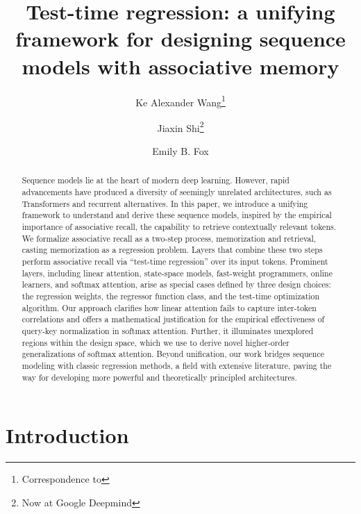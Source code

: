 \documentclass[notitlepage, 11pt]{article}
\title{Test-time regression: a unifying framework for designing sequence models with associative memory}
\author[$^1$]{Ke Alexander Wang\footnote{Correspondence to \email{alxwang@cs.stanford.edu}}}
\author[$^2$]{Jiaxin Shi\footnote{Now at Google Deepmind}}
\author[$^1$$^2$]{Emily B. Fox}
\affil[$^1$]{
  Department of Computer Science, Stanford University
}
\affil[$^2$]{
  Department of Statistics, Stanford University
}
\date{}
\begin{document}
\maketitle


\begin{abstract}






Sequence models lie at the heart of modern deep learning. However, rapid advancements have produced a diversity of seemingly unrelated architectures, such as Transformers and recurrent alternatives. In this paper, we introduce a unifying framework to understand and derive these sequence models, inspired by the empirical importance of associative recall, the capability to retrieve contextually relevant tokens. We formalize associative recall as a two-step process, memorization and retrieval, casting memorization as a regression problem. Layers that combine these two steps perform associative recall via ``test-time regression'' over its input tokens. Prominent layers, including linear attention, state-space models, fast-weight programmers, online learners, and softmax attention, arise as special cases defined by three design choices: the regression weights, the regressor function class, and the test-time optimization algorithm. Our approach clarifies how linear attention fails to capture inter-token correlations and offers a mathematical justification for the empirical effectiveness of query-key normalization in softmax attention. Further, it illuminates unexplored regions within the design space, which we use to derive novel higher-order generalizations of softmax attention. Beyond unification, our work bridges sequence modeling with classic regression methods, a field with extensive literature, paving the way for developing more powerful and theoretically principled architectures.
 






\end{abstract}







\section{Introduction}\label{sec:introduction}
\end{document}
